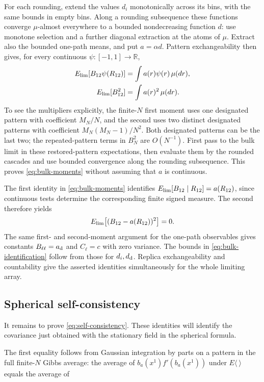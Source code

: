 \documentclass[11pt]{article}
\begin{document}
For each rounding, extend the values $d_i$ monotonically across its bins,
with the same bounds in empty bins. Along a rounding subsequence these
functions converge $\mu$-almost everywhere to a bounded nondecreasing
function $d$: use monotone selection and a further diagonal extraction
at the atoms of $\mu$. Extract also the bounded one-path means, and put
$a=\alpha d$. Pattern exchangeability then gives, for every continuous
$\psi:[-1,1]\to\mathbb R$,
\begin{equation}\label{eq:bulk-moments}
\begin{aligned}
 E_{\rm lim}[B_{12}\psi(R_{12})]
       &=\int a(r)\psi(r)\,\mu(dr),\\
 E_{\rm lim}[B_{12}^2]&=\int a(r)^2\,\mu(dr).
\end{aligned}
\end{equation}
To see the multipliers explicitly, the finite-$N$ first moment uses one
designated pattern with coefficient $M_N/N$, and the second uses two
distinct designated patterns with coefficient $M_N(M_N-1)/N^2$.
Both designated patterns can be the last two; the repeated-pattern terms
in $B_N^2$ are $O(N^{-1})$. First pass to the bulk limit in these
restored-pattern expectations, then evaluate them by the rounded cascades
and use bounded convergence along the rounding subsequence. This proves
\eqref{eq:bulk-moments} without assuming that $a$ is continuous.

The first identity in \eqref{eq:bulk-moments} identifies
$E_{\rm lim}[B_{12}\mid R_{12}]=a(R_{12})$, since continuous tests
determine the corresponding finite signed measure. The second therefore
yields
\[
 E_{\rm lim}\big[(B_{12}-a(R_{12}))^2\big]=0.
\]
The same first- and second-moment argument for the one-path observables
gives constants $B_{\ell\ell}=a_{\rm d}$ and $C_\ell=c$ with zero variance.
The bounds in \eqref{eq:bulk-identification} follow from those for
$d_i,d_{\rm d}$. Replica exchangeability and countability give the asserted
identities simultaneously for the whole limiting array.

\subsection{Spherical self-consistency}

It remains to prove \eqref{eq:self-consistency}. These identities will
identify the covariance just obtained with the stationary field in the
spherical formula.

The first equality follows from Gaussian integration by parts on a pattern in the full finite-$N$ Gibbs average: the average of $b_a(x^1) f'(b_a(x^1))$ under $E\langle\ \rangle$ equals the average of
\end{document}
